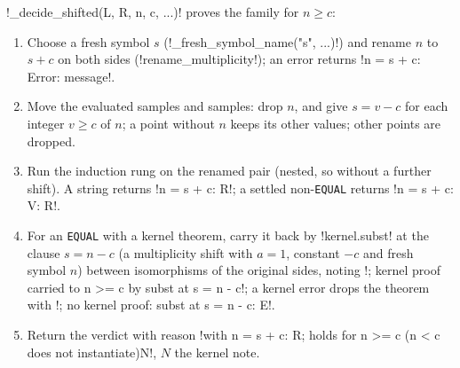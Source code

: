 \begin{algorithm}\label{alg:proofs-shifted}
\py!_decide_shifted(L, R, n, c, ...)! proves the family for $n\ge c$:
\begin{enumerate}
\item Choose a fresh symbol $s$ (\py!_fresh_symbol_name("s", ...)!) and rename $n$ to $s+c$ on both sides (\py!rename_multiplicity!); an error returns \code!n = s + c: Error: message!.
\item Move the evaluated samples and samples: drop $n$, and give $s=v-c$ for each integer $v\ge c$ of $n$; a point without $n$ keeps its other values; other points are dropped.
\item Run the induction rung on the renamed pair (nested, so without a further shift). A string returns \code!n = s + c: R!; a settled non-\texttt{EQUAL} returns \code!n = s + c: V: R!.
\item For an \texttt{EQUAL} with a kernel theorem, carry it back by \py!kernel.subst! at the clause $s=n-c$ (a multiplicity shift with $a=1$, constant $-c$ and fresh symbol $n$) between isomorphisms of the original sides, noting \code!; kernel proof carried to n >= c by subst at s = n - c!; a kernel error drops the theorem with \code!; no kernel proof: subst at s = n - c: E!.
\item Return the verdict with reason \code!with n = s + c: R; holds for n >= c (n < c does not instantiate)N!, $N$ the kernel note.
\end{enumerate}
\end{algorithm}


